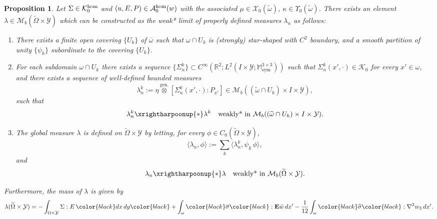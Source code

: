 \documentclass[reqno,10pt]{amsart}
\numberwithin{equation}{section}
\newtheorem{proposition}[theorem]{Proposition}
\theoremstyle{remark}
\newcommand{\BLACK}{\color{black}}
\newcommand{\PINK}{\color{black}}
\newcommand{\calA}{\mathcal{A}}
\newcommand{\calK}{\mathcal{K}}
\newcommand{\M}{\mathbb{M}}
\newcommand{\R}{\mathbb{R}}
\newcommand{\calY}{\mathcal{Y}}
\DeclareMathOperator{\sym}{sym}
\newcommand{\closure}[1]{\overline{#1}}
\newcommand{\weakstar}{\xrightharpoonup{*}}
\newcommand{\zerothI}[1]{\overline{#1}}
\newcommand{\firstI}[1]{\widehat{#1}}
\newcommand{\Mb}{\mathcal{M}_b}
\newcommand{\genprod}{\stackrel{\text{gen.}}{\otimes}}
\newcommand{\calXzero}[1]{\mathcal{X}_0({#1})}
\newcommand{\calYzero}[1]{\Upsilon_0({#1})}
\newcommand{\ext}[1]{\widetilde{#1}}
\newcommand{\E}{{\bf E}}
\newcommand{\D}{\nabla}
\begin{document}
\begin{proposition} \label{two-scale stress-strain duality - regime zero}
Let $\Sigma \in \calK^{\rm hom}_{0}$ and $(u,E,P) \in \calA^{\rm hom}_{0}(w)$ with the associated $\mu \in \calXzero{\ext{\omega}}$, $\kappa \in \calYzero{\ext{\omega}}$. 
There exists an element $\lambda \in \Mb(\ext{\Omega} \times \calY)$ which can be constructed as the weak* limit of properly defined measures $\lambda_n$ as follows:
\begin{enumerate}[label=\arabic*.]
	\item There exists a finite open covering $\{U_{k}\}$ of $\closure{\omega}$ such that $\omega \cap U_{k}$ is (strongly) star-shaped with $C^2$ boundary, and a smooth partition of unity $\{\psi_{k}\}$ subordinate to the covering $\{U_{k}\}$.
	\item For each subdomain $\omega \cap U_{k}$ there exists a sequence $\{ \Sigma^{k}_n \} \subset C^\infty(\R^2;L^2(I \times \calY;\M^{3 \times 3}_{\sym}))$ such that $\Sigma^{k}_n(x',\cdot) \in \calK_{0}$ for every $x' \in \omega$,
	and there exists a sequence of well-defined bounded measures 
	\begin{equation*}
		\lambda^{k}_n := \eta \genprod [ \Sigma^{k}_n(x',\cdot) : P_{x'} ] \in \Mb((\widetilde{\omega} \cap U_{k}) \times I \times \calY),
	\end{equation*}
	such that
	\begin{equation*}
		\lambda^{k}_n \weakstar \lambda^{k} \quad \text{weakly* in $\Mb((\widetilde{\omega} \cap U_{k}) \times I \times \calY)$}.
	\end{equation*}
	\item The global measure $\lambda$ is defined on $\ext{\Omega} \times \calY$ by 
	letting, for every $\phi \in C_0(\ext{\Omega} \times \calY)$,
	\begin{equation*}
		\langle \lambda_n, \phi \rangle := \sum_{k} \langle \lambda^{k}_n, \psi_{k}\,\phi \rangle,
	\end{equation*}
	and
	\begin{equation*}
		\lambda_n \weakstar \lambda \quad \text{weakly* in $\Mb(\ext{\Omega} \times \calY)$}.
	\end{equation*}
\end{enumerate}
Furthermore, the mass of $\lambda$ is given by
\begin{equation} \label{mass of lambda - regime zero}
	\lambda(\ext{\Omega} \times \calY) = -\int_{\Omega \times \calY} \Sigma : E \,{\PINK dx\,dy\BLACK} + \int_{\omega} {\PINK\zerothI{\sigma}\BLACK} : {\E}\bar{w} \,dx' - \frac{1}{12} \int_{\omega} {\PINK\firstI{\sigma}\BLACK} : {\D}^2w_3 \,dx'.
\end{equation}
\end{proposition}
\end{document}
